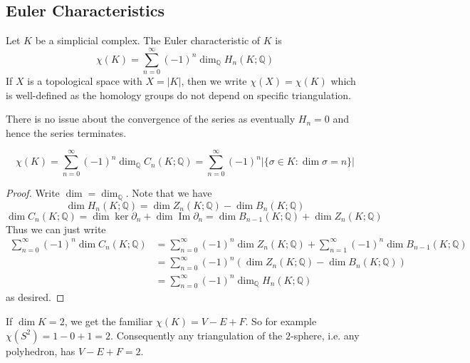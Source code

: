 \subsection{Euler Characteristics}
\begin{definition}
    Let $K$ be a simplicial complex.
    The Euler characteristic of $K$ is
    $$\chi(K)=\sum_{n=0}^\infty(-1)^n\dim_{\mathbb Q}H_n(K;\mathbb Q)$$
    If $X$ is a topological space with $X=|K|$, then we write $\chi(X)=\chi(K)$ which is well-defined as the homology groups do not depend on specific triangulation.
\end{definition}
There is no issue about the convergence of the series as eventually $H_n=0$ and hence the series terminates.
\begin{lemma}\label{euler}
    $$\chi(K)=\sum_{n=0}^\infty(-1)^n\dim_{\mathbb Q}C_n(K;\mathbb Q)=\sum_{n=0}^\infty(-1)^n|\{\sigma\in K:\dim\sigma=n\}|$$
\end{lemma}
\begin{proof}
    Write $\dim=\dim_\mathbb Q$.
    Note that we have
    $$\dim H_n(K;\mathbb Q)=\dim Z_n(K;\mathbb Q)-\dim B_n(K;\mathbb Q)$$
    $$\dim C_n(K;\mathbb Q)=\dim\ker\partial_n+\dim\operatorname{Im}\partial_n=\dim B_{n-1}(K;\mathbb Q)+\dim Z_n(K;\mathbb Q)$$
    Thus we can just write
    \begin{align*}
        \sum_{n=0}^\infty(-1)^n\dim C_n(K;\mathbb Q)&=\sum_{n=0}^\infty (-1)^n\dim Z_n(K;\mathbb Q)+\sum_{n=1}^\infty (-1)^n\dim B_{n-1}(K;\mathbb Q)\\
        &=\sum_{n=0}^\infty (-1)^n(\dim Z_n(K;\mathbb Q)-\dim B_n(K;\mathbb Q))\\
        &=\sum_{n=0}^\infty(-1)^n\dim_{\mathbb Q}H_n(K;\mathbb Q)
    \end{align*}
    as desired.
\end{proof}
\begin{example}
    If $\dim K=2$, we get the familiar $\chi(K)=V-E+F$.
    So for example $\chi(S^2)=1-0+1=2$.
    Consequently any triangulation of the $2$-sphere, i.e. any polyhedron, has $V-E+F=2$.
\end{example}
